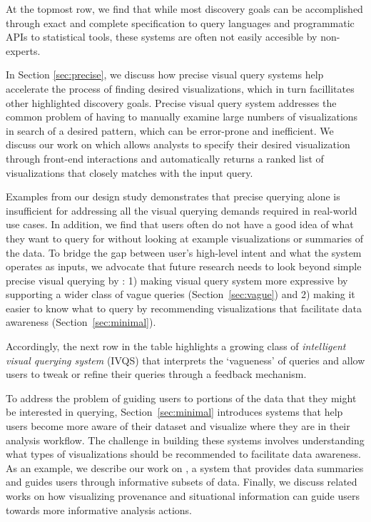 \newpage





 At the topmost row, we find that while most discovery goals can be accomplished through exact and complete specification to query languages and programmatic APIs to statistical tools, these systems are often not easily accesible by non-experts.
\par In Section \ref{sec:precise}, we discuss how precise visual query systems help accelerate the process of finding desired visualizations, which in turn facillitates other highlighted discovery goals. Precise visual query system addresses the common problem of having to manually examine large numbers of visualizations in search of a desired pattern, which can be error-prone and inefficient. We discuss our work on \zv which allows analysts to specify their desired visualization through front-end interactions and automatically returns a ranked list of visualizations that closely matches with the input query.
\par Examples from our \zv design study demonstrates that precise querying alone is insufficient for addressing all the visual querying demands required in real-world use cases. In addition, we find that users often do not have a good idea of what they want to query for without looking at example visualizations or summaries of the data. To bridge the gap between user's high-level intent and what the system operates as inputs, we advocate that future research needs to look beyond simple precise visual querying by : 1) making visual query system more expressive by supporting a wider class of vague queries (Section~\ref{sec:vague}) and 2) making it easier to know what to query by recommending visualizations that facilitate data awareness (Section~\ref{sec:minimal}).
\par Accordingly, the next row in the table highlights a growing class of \textit{intelligent visual querying system} (IVQS) that interprets the `vagueness' of queries and allow users to tweak or refine their queries through a feedback mechanism.  
\par To address the problem of guiding users to portions of the data that they might be interested in querying, Section~\ref{sec:minimal} introduces systems that help users become more aware of their dataset and visualize where they are in their analysis workflow. The challenge in building these systems involves understanding what types of visualizations should be recommended to facilitate data awareness. As an example, we describe our work on \sbd, a system that provides data summaries and guides users through informative subsets of data. Finally, we discuss related works on how visualizing provenance and situational information can guide users towards more informative analysis actions.
